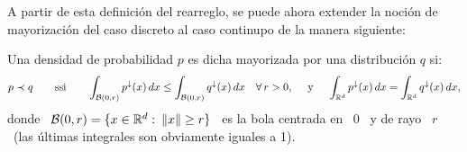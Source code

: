 %
\begin{figure}[h!]
%
\begin{center}  \end{center}
%
\label{Fig:MP:ensemblerearreglado}
\end{figure}

A partir de esta definici\'on del rearreglo, se puede ahora extender la noci\'on
de mayorizaci\'on del caso discreto al caso continupo de la manera siguiente:
%
\begin{definicion}\label{Def:MP:MayorizacionC}
  Una densidad  de probabilidad $p$  es dicha mayorizada por  una distribuci\'on
  $q$ si:
  \[
  p \prec  q \qquad \mbox{ssi}  \qquad \int_{\mathcal{B}(0,r)} p^\downarrow(x) \,  dx \le
  \int_{\mathcal{B}(0,r)} q^\downarrow(x) \, dx \quad \forall  \, r > 0, \quad \mbox{ y }
  \quad \int_{\mathbb{R}^d} p^\downarrow(x) \, dx = \int_{\mathbb{R}^d} q^\downarrow(x) \,
  dx,
  \]
  donde \ $\mathcal{B}(0,r) = \{ x \in \mathbb{R}^d:  \: \|x\| \ge r \}$ \ es la bola centrada
  en \ $0$ \ y de rayo  \ $r$ \ (las \'ultimas integrales son obviamente iguales
  a 1).
\end{definicion}
%



\label{Ssec:MP:Transformacion}

